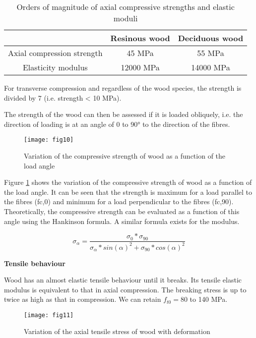 \begin{table} \centering
	\begin{tabular}{ccc}
		\toprule %
		& Resinous wood & Deciduous wood  \\\midrule
		Axial compression strength & 45 \unit{\mega\pascal}
		& 55 \unit{\mega\pascal} \\\midrule
		Elasticity modulus & 12000 \unit{\mega\pascal}
		& 14000 \unit{\mega\pascal} \\
		\bottomrule %
	\end{tabular}
	\caption{Orders of magnitude of axial compressive strengths and elastic moduli}
	\label{fig:fig9}
\end{table}


For transverse compression and regardless of the wood species, the strength is divided by 7 (i.e. strength < 10 MPa). 

The strength of the wood can then be assessed if it is loaded obliquely, i.e. the direction of loading is at an angle of 0 to 90° to the direction of the fibres. 


\begin{figure}[htp]
	\centering
	\texttt{[image: fig10]}
	\caption{Variation of the compressive strength of wood as a function of the load angle}
	\label{fig:fig10}
\end{figure}

Figure \ref{fig:fig10} shows the variation of the compressive strength of wood as a function of the load angle. It can be seen that the strength is maximum for a load parallel to the fibres (fc,0) and minimum for a load perpendicular to the fibres (fc,90). Theoretically, the compressive strength can be evaluated as a function of this angle using the Hankinson formula. A similar formula exists for the modulus.

\begin{equation}
	\sigma_{\alpha} = \frac{\sigma_{0}*\sigma_{90}}{\sigma_{\alpha}*sin(\alpha)^2+\sigma_{90}*cos(\alpha)^2}
\end{equation}

\textbf{Tensile behaviour}

Wood has an almost elastic tensile behaviour until it breaks. Its tensile elastic modulus is equivalent to that in axial compression. The breaking stress is up to twice as high as that in compression. We can retain $f_{t0}=80$ to 140 MPa.


\begin{figure}[htp]
	\centering
	\texttt{[image: fig11]}
	\caption{Variation of the axial tensile stress of wood with deformation}
	\label{fig:galaxy}
\end{figure}

